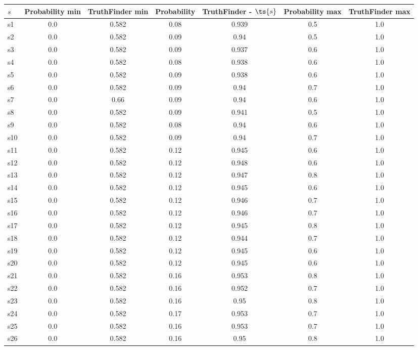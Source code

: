 \documentclass{article}
\begin{document}
\noindent\begin{tabular}{|l|c|c|c|c|c|c|}
\hline
$s$& Probability min & TruthFinder min & Probability & TruthFinder - $\ts{s}$ & Probability max & TruthFinder max\\
\hline
s1 &0.0 & 0.582 & 0.08 & 0.939 & 0.5 & 1.0\\
\hline
s2 &0.0 & 0.582 & 0.09 & 0.94 & 0.5 & 1.0\\
\hline
s3 &0.0 & 0.582 & 0.09 & 0.937 & 0.6 & 1.0\\
\hline
s4 &0.0 & 0.582 & 0.08 & 0.938 & 0.6 & 1.0\\
\hline
s5 &0.0 & 0.582 & 0.09 & 0.938 & 0.6 & 1.0\\
\hline
s6 &0.0 & 0.582 & 0.09 & 0.94 & 0.7 & 1.0\\
\hline
s7 &0.0 & 0.66 & 0.09 & 0.94 & 0.6 & 1.0\\
\hline
s8 &0.0 & 0.582 & 0.09 & 0.941 & 0.5 & 1.0\\
\hline
s9 &0.0 & 0.582 & 0.08 & 0.94 & 0.6 & 1.0\\
\hline
s10 &0.0 & 0.582 & 0.09 & 0.94 & 0.7 & 1.0\\
\hline
s11 &0.0 & 0.582 & 0.12 & 0.945 & 0.6 & 1.0\\
\hline
s12 &0.0 & 0.582 & 0.12 & 0.948 & 0.6 & 1.0\\
\hline
s13 &0.0 & 0.582 & 0.12 & 0.947 & 0.8 & 1.0\\
\hline
s14 &0.0 & 0.582 & 0.12 & 0.945 & 0.6 & 1.0\\
\hline
s15 &0.0 & 0.582 & 0.12 & 0.946 & 0.7 & 1.0\\
\hline
s16 &0.0 & 0.582 & 0.12 & 0.946 & 0.7 & 1.0\\
\hline
s17 &0.0 & 0.582 & 0.12 & 0.945 & 0.8 & 1.0\\
\hline
s18 &0.0 & 0.582 & 0.12 & 0.944 & 0.7 & 1.0\\
\hline
s19 &0.0 & 0.582 & 0.12 & 0.945 & 0.6 & 1.0\\
\hline
s20 &0.0 & 0.582 & 0.12 & 0.945 & 0.6 & 1.0\\
\hline
s21 &0.0 & 0.582 & 0.16 & 0.953 & 0.8 & 1.0\\
\hline
s22 &0.0 & 0.582 & 0.16 & 0.952 & 0.7 & 1.0\\
\hline
s23 &0.0 & 0.582 & 0.16 & 0.95 & 0.8 & 1.0\\
\hline
s24 &0.0 & 0.582 & 0.17 & 0.953 & 0.7 & 1.0\\
\hline
s25 &0.0 & 0.582 & 0.16 & 0.953 & 0.7 & 1.0\\
\hline
s26 &0.0 & 0.582 & 0.16 & 0.95 & 0.8 & 1.0\\

\end{tabular}
\end{document}
